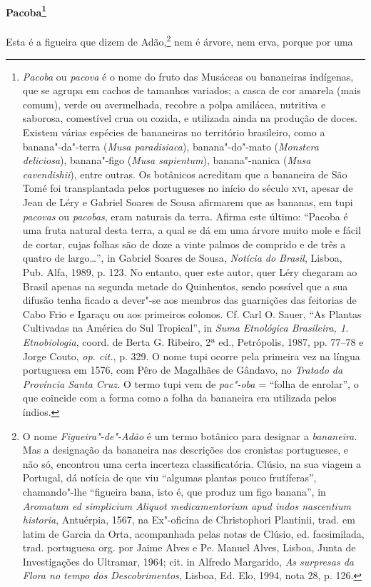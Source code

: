\paragraph{Pacoba\footnote{ \textit{Pacoba} ou \textit{pacova} é o
nome do fruto das Musáceas ou bananeiras indígenas, que se agrupa em
cachos de tamanhos variados; a casca de cor amarela (mais comum), verde
ou avermelhada, recobre a polpa amilácea, nutritiva e saborosa,
comestível crua ou cozida, e utilizada ainda na produção de doces.
Existem várias espécies de bananeiras no território brasileiro, como a
banana"-da"-terra (\textit{Musa paradisiaca}), banana"-do"-mato
(\textit{Monstera deliciosa}), banana"-figo (\textit{Musa sapientum}), 
banana"-nanica (\textit{Musa cavendishii}), entre outras. Os botânicos
acreditam que a bananeira de São Tomé foi transplantada pelos
portugueses no início do século \textsc{xvi}, apesar de Jean de Léry e Gabriel
Soares de Sousa afirmarem que as bananas, em tupi \textit{pacovas} ou
\textit{pacobas}, eram naturais da terra. Afirma este último: ``Pacoba é
uma fruta natural desta terra, a qual se dá em uma árvore muito mole e
fácil de cortar, cujas folhas são de doze a vinte palmos de comprido e
de três a quatro de largo\ldots{}'', in Gabriel Soares de Sousa,
\textit{Notícia do Brasil}, Lisboa, Pub. Alfa, 1989, p. 123. No
entanto, quer este autor, quer Léry chegaram ao Brasil apenas na
segunda metade do Quinhentos, sendo possível que a sua difusão tenha
ficado a dever"-se aos membros das guarnições das feitorias de Cabo Frio
e Igaraçu ou aos primeiros colonos. Cf. Carl O. Sauer, ``As Plantas
Cultivadas na América do Sul Tropical'', in \textit{Suma Etnológica
Brasileira, 1. Etnobiologia}, coord. de Berta G. Ribeiro, 2ª ed.,
Petrópolis, 1987, pp. 77--78 e Jorge Couto, \textit{op. cit.}, p. 329. O
nome tupi ocorre pela primeira vez na língua portuguesa em 1576, com
Pêro de Magalhães de Gândavo, no \textit{Tratado da Província Santa Cruz.}
O termo tupi vem de \textit{pac"-oba} = ``folha de enrolar'', o que
coincide com a forma como a folha da bananeira era utilizada pelos
índios.}} Esta é a figueira que dizem de Adão,\footnote{ O
nome \textit{Figueira"-de"-Adão} é um termo botânico para designar a
\textit{bananeira.} Mas a designação da bananeira nas descrições dos
cronistas portugueses, e não só, encontrou uma certa incerteza
classificatória. Clúsio, na sua viagem a Portugal, dá notícia de que
viu ``algumas plantas pouco frutíferas'', chamando"-lhe ``figueira bana,
isto é, que produz um figo banana'', in \textit{Aromatum ed simplicium
Aliquot medicamentorium apud indos nascentium historia}, Antuérpia,
1567, na Ex"-oficina de Christophori Plantinii, trad. em latim de Garcia
da Orta, acompanhada pelas notas de Clúsio, ed. facsimilada, trad.
portuguesa org. por Jaime Alves e Pe. Manuel Alves, Lisboa, Junta de
Investigações do Ultramar, 1964; cit. in Alfredo Margarido, \textit{As
surpresas da Flora no tempo dos Descobrimentos}, Lisboa, Ed. Elo, 1994,
nota 28, p. 126.} nem é árvore, nem erva, porque por uma
